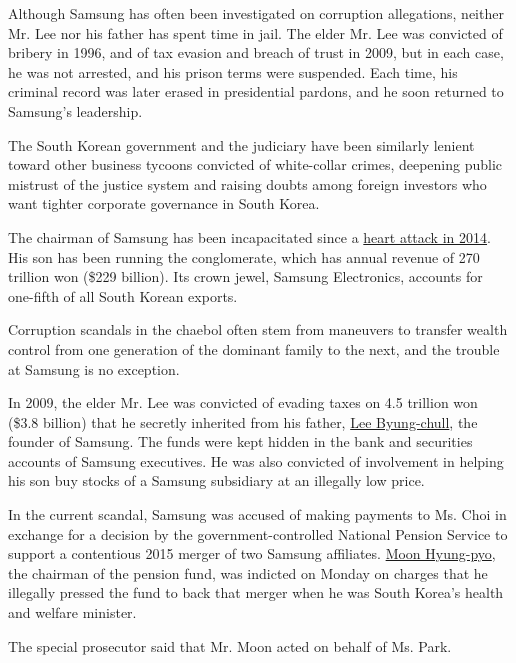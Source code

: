 Although Samsung has often been investigated on corruption allegations,
neither Mr. Lee nor his father has spent time in jail. The elder Mr. Lee
was convicted of bribery in 1996, and of tax evasion and breach of trust
in 2009, but in each case, he was not arrested, and his prison terms
were suspended. Each time, his criminal record was later erased in
presidential pardons, and he soon returned to Samsung's leadership.

The South Korean government and the judiciary have been similarly
lenient toward other business tycoons convicted of white-collar crimes,
deepening public mistrust of the justice system and raising doubts among
foreign investors who want tighter corporate governance in South Korea.

The chairman of Samsung has been incapacitated since a
\href{https://www.nytimes3xbfgragh.onion/2014/05/12/business/international/samsungs-chairman-has-surgery-after-heart-attack.html}{heart
attack in 2014}. His son has been running the conglomerate, which has
annual revenue of 270 trillion won (\$229 billion). Its crown jewel,
Samsung Electronics, accounts for one-fifth of all South Korean exports.

Corruption scandals in the chaebol often stem from maneuvers to transfer
wealth control from one generation of the dominant family to the next,
and the trouble at Samsung is no exception.

In 2009, the elder Mr. Lee was convicted of evading taxes on 4.5
trillion won (\$3.8 billion) that he secretly inherited from his father,
\href{http://www.nytimes3xbfgragh.onion/1987/11/20/obituaries/lee-byung-chull-77-industrialist-of-korea.html}{Lee
Byung-chull}, the founder of Samsung. The funds were kept hidden in the
bank and securities accounts of Samsung executives. He was also
convicted of involvement in helping his son buy stocks of a Samsung
subsidiary at an illegally low price.

In the current scandal, Samsung was accused of making payments to Ms.
Choi in exchange for a decision by the government-controlled National
Pension Service to support a contentious 2015 merger of two Samsung
affiliates.
\href{https://www.nytimes3xbfgragh.onion/2016/12/31/world/asia/south-korea-samsung-merger-moon-hyung-pyo.html}{Moon
Hyung-pyo}, the chairman of the pension fund, was indicted on Monday on
charges that he illegally pressed the fund to back that merger when he
was South Korea's health and welfare minister.

The special prosecutor said that Mr. Moon acted on behalf of Ms. Park.

